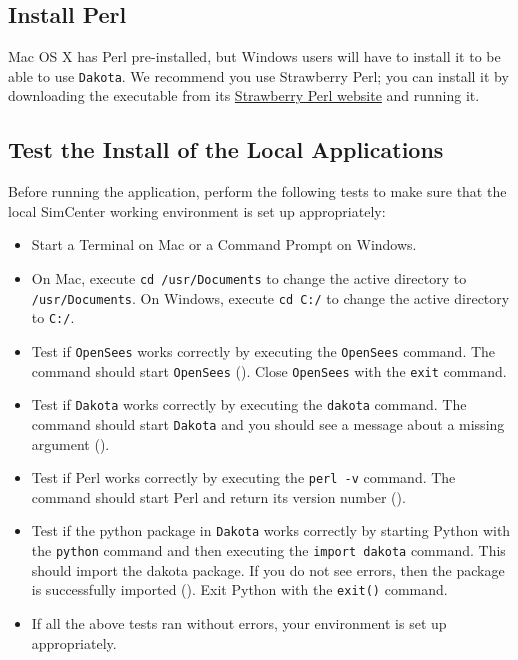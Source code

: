 \subsection{Install  Perl}

Mac OS X has Perl pre-installed, but Windows users will have to
install it to be able to use \texttt{Dakota}. We recommend you use Strawberry
Perl; you can install it by downloading the executable from
its \href{http://strawberryperl.com}{Strawberry Perl website} and
running it.

\subsection{Test the Install of the Local Applications}

Before running the \texttt{\getsoftwarename{}} application, perform the following tests to
make sure that the local SimCenter working environment is set up
appropriately:

\begin{itemize}
    \item Start a Terminal on Mac or a Command Prompt on Windows.
    \item On Mac, execute \texttt{cd /usr/Documents} to change the active directory to \texttt{/usr/Documents}. On Windows, execute \texttt{cd C:/} to change the active directory to \texttt{C:/}.
    \item Test if \texttt{OpenSees} works correctly by executing the \texttt{OpenSees} command. The command should start \texttt{OpenSees} (). Close \texttt{OpenSees} with the \texttt{exit} command.
    \item Test if \texttt{Dakota} works correctly by executing the \texttt{dakota} command. The command should start \texttt{Dakota} and you should see a message about a missing argument ().
    \item Test if Perl works correctly by executing the \texttt{perl -v} command. The command should start Perl and return its version number ().
    \item Test if the python package in \texttt{Dakota} works correctly by starting Python with the \texttt{python} command and then executing the \texttt{import dakota} command. This should import the dakota package. If you do not see errors, then the package is successfully imported (). Exit Python with the \texttt{exit()} command.
    \item If all the above tests ran without errors, your environment is set up appropriately.
\end{itemize}

